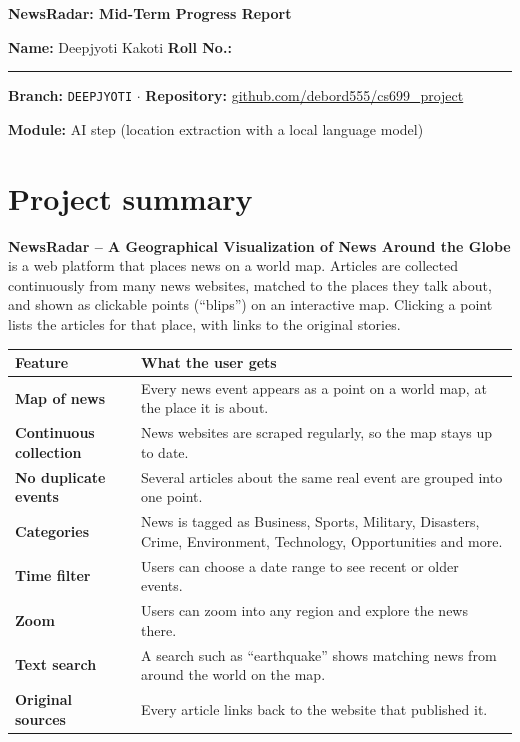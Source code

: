 \documentclass[11pt,a4paper]{article}
\newcommand{\head}[1]{\textbf{#1}}
\newcommand{\code}[1]{\texttt{#1}}
\begin{document}
{\LARGE\bfseries\color{heading} NewsRadar: Mid-Term Progress Report}\par
\vspace{0.3em}
\textbf{Name:} Deepjyoti Kakoti \quad
\textbf{Roll No.:} \rule{3cm}{0.4pt}\par
\textbf{Branch:} \code{DEEPJYOTI} $\cdot$
\textbf{Repository:} \href{https://github.com/debord555/cs699_project}{github.com/debord555/cs699\_project}\par
\textbf{Module:} AI step (location extraction with a local language model)

\section{Project summary}

\textbf{NewsRadar -- A Geographical Visualization of News Around the Globe} is a
web platform that places news on a world map. Articles are collected
continuously from many news websites, matched to the places they talk about,
and shown as clickable points (``blips'') on an interactive map. Clicking a
point lists the articles for that place, with links to the original stories.

\begin{tabularx}{\textwidth}{>{\bfseries}p{4.2cm} L}
\toprule
{} \head{Feature} & \head{What the user gets} \\
\midrule
Map of news & Every news event appears as a point on a world map, at the place it is about. \\
Continuous collection & News websites are scraped regularly, so the map stays up to date. \\
No duplicate events & Several articles about the same real event are grouped into one point. \\
Categories & News is tagged as Business, Sports, Military, Disasters, Crime, Environment, Technology, Opportunities and more. \\
Time filter & Users can choose a date range to see recent or older events. \\
Zoom & Users can zoom into any region and explore the news there. \\
Text search & A search such as ``earthquake'' shows matching news from around the world on the map. \\
Original sources & Every article links back to the website that published it. \\
\bottomrule
\end{tabularx}
\end{document}
